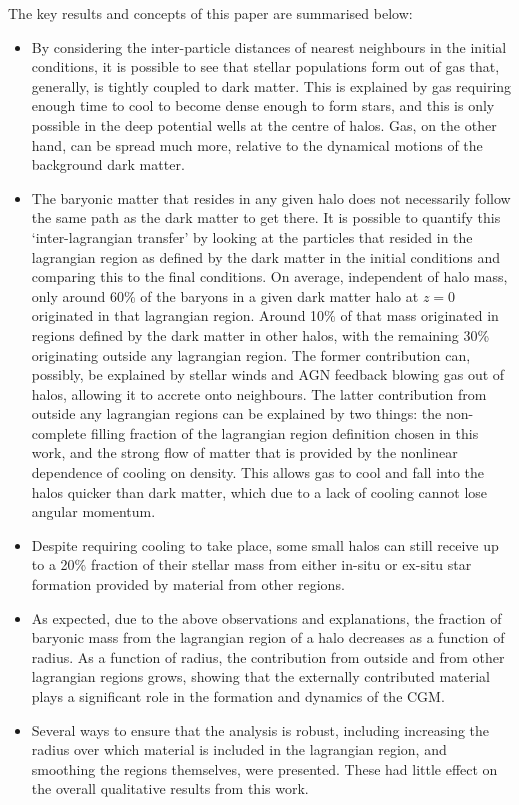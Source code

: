 The key results and concepts of this paper are summarised below:
\begin{itemize}
    \item By considering the inter-particle distances of nearest neighbours
    in the initial conditions, it is possible to see that stellar populations
    form out of gas that, generally, is tightly coupled to dark matter. This
    is explained by gas requiring enough time to cool to become dense enough
    to form stars, and this is only possible in the deep potential wells at
    the centre of halos. Gas, on the other hand, can be spread much more,
    relative to the dynamical motions of the background dark matter.
    \item The baryonic matter that resides in any given halo does not
    necessarily follow the same path as the dark matter to get there. It is
    possible to quantify this `inter-lagrangian transfer' by looking at the
    particles that resided in the lagrangian region as defined by the dark
    matter in the initial conditions and comparing this to the final
    conditions. On average, independent of halo mass, only around 60\% of the
    baryons in a given dark matter halo at $z=0$ originated in that
    lagrangian region. Around 10\% of that mass originated in regions defined
    by the dark matter in other halos, with the remaining 30\% originating
    outside any lagrangian region. The former contribution can, possibly, be
    explained by stellar winds and AGN feedback blowing gas out of halos,
    allowing it to accrete onto neighbours. The latter contribution from
    outside any lagrangian regions can be explained by two things: the
    non-complete filling fraction of the lagrangian region definition chosen
    in this work, and the strong flow of matter that is provided by the
    nonlinear dependence of cooling on density. This allows gas to cool and
    fall into the halos quicker than dark matter, which due to a lack of
    cooling cannot lose angular momentum.
    \item Despite requiring cooling to take place, some small halos can still
    receive up to a 20\% fraction of their stellar mass from either in-situ
    or ex-situ star formation provided by material from other regions.
    \item As expected, due to the above observations and explanations, the
    fraction of baryonic mass from the lagrangian region of a halo decreases
    as a function of radius. As a function of radius, the contribution from
    outside and from other lagrangian regions grows, showing that the
    externally contributed material plays a significant role in the formation
    and dynamics of the CGM.
    \item Several ways to ensure that the analysis is robust, including
    increasing the radius over which material is included in the lagrangian
    region, and smoothing the regions themselves, were presented. These had
    little effect on the overall qualitative results from this work.
\end{itemize}
